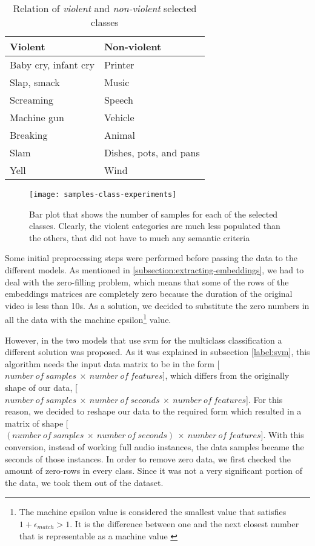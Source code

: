 	\begin{table}[ht]
		\centering
		\begin{tabular}{|| m{10em} | m{10em} ||}
			\hline
			\textbf{Violent} & \textbf{Non-violent} \\
			\hline\hline
			Baby cry, infant cry & Printer \\
			\hline
			Slap, smack & Music \\
			\hline
			Screaming & Speech \\
			\hline
			Machine gun & Vehicle \\
			\hline
			Breaking & Animal \\
			\hline
			Slam & Dishes, pots, and pans \\
			\hline
			Yell & Wind \\
			\hline
		\end{tabular}
	\caption{Relation of \textit{violent} and \textit{non-violent} selected classes}
	\label{table:7}
	\end{table}
	
	\begin{figure}[t]
		\centering
		\captionsetup{justification=centering}
		\texttt{[image: samples-class-experiments]}
		\caption{Bar plot that shows the number of samples for each of the selected classes. Clearly, the violent categories are much less populated than the others, that did not have to much any semantic criteria}
		\label{fig:mesh14}
	\end{figure}

	Some initial preprocessing steps were performed before passing the data to the different models. As mentioned in \ref{subsection:extracting-embeddings}, we had to deal with the zero-filling problem, which means that some of the rows of the embeddings matrices are completely zero because the duration of the original video is less than 10s. As a solution, we decided to substitute the zero numbers in all the data with the machine epsilon\footnote{The machine epsilon value is considered the smallest value that satisfies $1 + \epsilon_{match} > 1$. It is the difference between one and the next closest number that is representable as a machine value \cite{Kaw}} value. 
	
	However, in the two models that use \acrshort{svm} for the multiclass classification a different solution was proposed. As it was explained in subsection \ref{label:svm}, this algorithm needs the input data matrix to be in the form [$number\ of\ samples\ \times\ number\ of\ features$], which differs from the originally shape of our data, [$number\ of\ samples\ \times\ number\ of\ seconds\ \times\ number\ of\ features$]. For this reason, we decided to reshape our data to the required form which resulted in a matrix of shape [$(number\ of\ samples\ \times\ number\ of\ seconds)\ \times\ number\ of\ features$]. With this conversion, instead of working  full audio instances, the data samples became the seconds of those instances. In order to remove zero data, we first checked the amount of zero-rows in every class. Since it was not a very significant portion of the data, we took them out of the dataset. 
	
